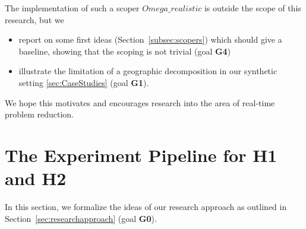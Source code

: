 \documentclass{article}
\begin{document}
The implementation of such a scoper $Omega\_realistic$ is outside the scope of this research, but we
\begin{itemize}
\item report on some first ideas (Section~\ref{subsec:scopers}) which should give a baseline, showing that the scoping is not trivial  (goal \textbf{G4})
\item illustrate the limitation of a geographic decomposition in our synthetic setting \ref{sec:CaseStudies} (goal \textbf{G1}).
\end{itemize}
We hope this motivates and encourages research into the area of real-time problem reduction.


\section{The Experiment Pipeline for H1 and H2}

In this section, we formalize the ideas of our research approach as outlined in Section~\ref{sec:researchapproach} (goal \textbf{G0}).


\end{document}
